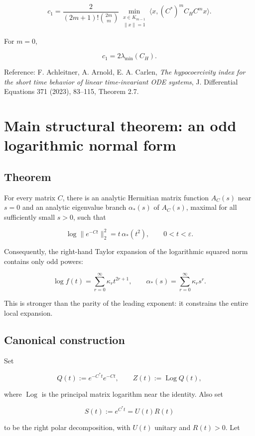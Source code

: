 \documentclass[11pt,a4paper]{article}
\DeclareMathOperator{\Log}{Log}
\begin{document}
\[
\boxed{
 c_1=\frac{2}{(2m+1)!\binom{2m}{m}}
 \min_{\substack{x\in K_{m-1}\\ \|x\|=1}}
 \langle x,(C^*)^mC_HC^m x\rangle .
}
\]

For \(m=0\),

\[
\boxed{c_1=2\lambda_{\min}(C_H).}
\]

Reference: F. Achleitner, A. Arnold, E. A. Carlen, \emph{The hypocoercivity index for the short time behavior of linear time-invariant ODE systems}, J. Differential Equations 371 (2023), 83--115, Theorem 2.7.

\section{Main structural theorem: an odd logarithmic normal form}\label{main-structural-theorem-an-odd-logarithmic-normal-form}

\subsection{Theorem}\label{theorem}

For every matrix \(C\), there is an analytic Hermitian matrix function \(A_C(s)\) near \(s=0\) and an analytic eigenvalue branch \(\alpha_*(s)\) of \(A_C(s)\), maximal for all sufficiently small \(s>0\), such that

\[
\boxed{
 \log\|e^{-Ct}\|_2^2=t\,\alpha_*(t^2),\qquad 0<t<\varepsilon.
}
\]

Consequently, the right-hand Taylor expansion of the logarithmic squared norm contains only odd powers:

\[
\boxed{
 \log f(t)=\sum_{r=0}^{\infty}\kappa_r t^{2r+1},
 \qquad
 \alpha_*(s)=\sum_{r=0}^{\infty}\kappa_r s^r.
}
\]

This is stronger than the parity of the leading exponent: it constrains the entire local expansion.

\subsection{Canonical construction}\label{canonical-construction}

Set

\[
Q(t):=e^{-C^*t}e^{-Ct},\qquad Z(t):=\Log Q(t),
\]

where \(\Log\) is the principal matrix logarithm near the identity. Also set

\[
S(t):=e^{C^*t}=U(t)R(t)
\]

to be the right polar decomposition, with \(U(t)\) unitary and \(R(t)>0\). Let
\end{document}
